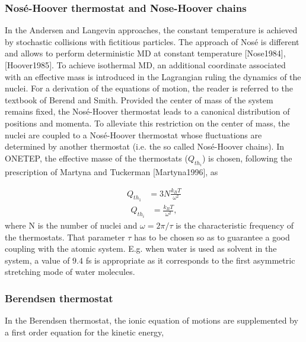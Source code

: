 \documentclass[letterpaper,10pt,english]{sphinxmanual}
\begin{document}
\subsubsection{Nosé-Hoover thermostat and Nose-Hoover chains}
\label{\detokenize{BOMD:nose-hoover-thermostat-and-nose-hoover-chains}}
In the Andersen and Langevin approaches, the constant temperature is
achieved by stochastic collisions with fictitious particles. The
approach of Nosé is different and allows to perform deterministic MD at
constant temperature {[}Nose1984{]}, {[}Hoover1985{]}. To achieve
isothermal MD, an additional coordinate associated with an effective
mass is introduced in the Lagrangian ruling the dynamics of the nuclei.
For a derivation of the equations of motion, the reader is referred to
the textbook of Berend and Smith. Provided the center of mass of the
system remains fixed, the Nosé-Hoover thermostat leads to a canonical
distribution of positions and momenta. To alleviate this restriction on
the center of mass, the nuclei are coupled to a Nosé-Hoover thermostat
whose fluctuations are determined by another thermostat (i.e. the so
called Nosé-Hoover chains). In ONETEP, the effective masse of the
thermostats (\(Q_{th_i}\)) is chosen, following the prescription of
Martyna and Tuckerman {[}Martyna1996{]}, as

\label{\detokenize{BOMD:equation-nose1}}\begin{equation}\label{equation:BOMD:nose1}
\begin{split}Q_{th_1} &= 3N  \frac{k_B T}{\omega^2}\end{split}
\end{equation}\label{\detokenize{BOMD:equation-nose2}}\begin{equation}\label{equation:BOMD:nose2}
\begin{split}Q_{th_i} &= \frac{k_B T}{\omega^2},\end{split}
\end{equation}
where N is the number of nuclei and \(\omega= 2 \pi / \tau\) is the
characteristic frequency of the thermostats. That parameter \(\tau\)
has to be chosen so as to guarantee a good coupling with the atomic
system. E.g. when water is used as solvent in the system, a value of
\(9.4\) fs is appropriate as it corresponds to the first asymmetric
stretching mode of water molecules.


\subsubsection{Berendsen thermostat}
\label{\detokenize{BOMD:berendsen-thermostat}}
In the Berendsen thermostat, the ionic equation of motions are
supplemented by a first order equation for the kinetic energy,
\end{document}
